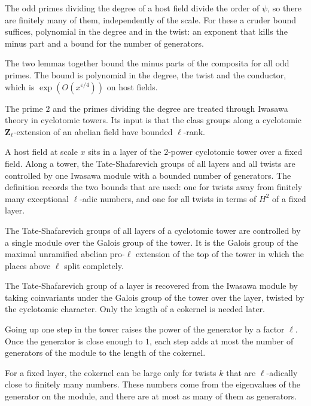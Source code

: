 The odd primes dividing the degree of a host field divide the order of $\psi$, so there are finitely many of them, independently of the scale. For these a cruder bound suffices, polynomial in the degree and in the twist: an exponent that kills the minus part and a bound for the number of generators.

The two lemmas together bound the minus parts of the composita for all odd primes. The bound is polynomial in the degree, the twist and the conductor, which is $\exp(O(x^{\varepsilon/4}))$ on host fields.

The prime $2$ and the primes dividing the degree are treated through Iwasawa theory in cyclotomic towers. Its input is that the class groups along a cyclotomic $\mathbf Z_\ell$-extension of an abelian field have bounded $\ell$-rank.

A host field at scale $x$ sits in a layer of the $2$-power cyclotomic tower over a fixed field. Along a tower, the Tate-Shafarevich groups of all layers and all twists are controlled by one Iwasawa module with a bounded number of generators. The definition records the two bounds that are used: one for twists away from finitely many exceptional $\ell$-adic numbers, and one for all twists in terms of $H^2$ of a fixed layer.

The Tate-Shafarevich groups of all layers of a cyclotomic tower are controlled by a single module over the Galois group of the tower. It is the Galois group of the maximal unramified abelian pro-$\ell$ extension of the top of the tower in which the places above $\ell$ split completely.

The Tate-Shafarevich group of a layer is recovered from the Iwasawa module by taking coinvariants under the Galois group of the tower over the layer, twisted by the cyclotomic character. Only the length of a cokernel is needed later.

Going up one step in the tower raises the power of the generator by a factor $\ell$. Once the generator is close enough to $1$, each step adds at most the number of generators of the module to the length of the cokernel.

For a fixed layer, the cokernel can be large only for twists $k$ that are $\ell$-adically close to finitely many numbers. These numbers come from the eigenvalues of the generator on the module, and there are at most as many of them as generators.

